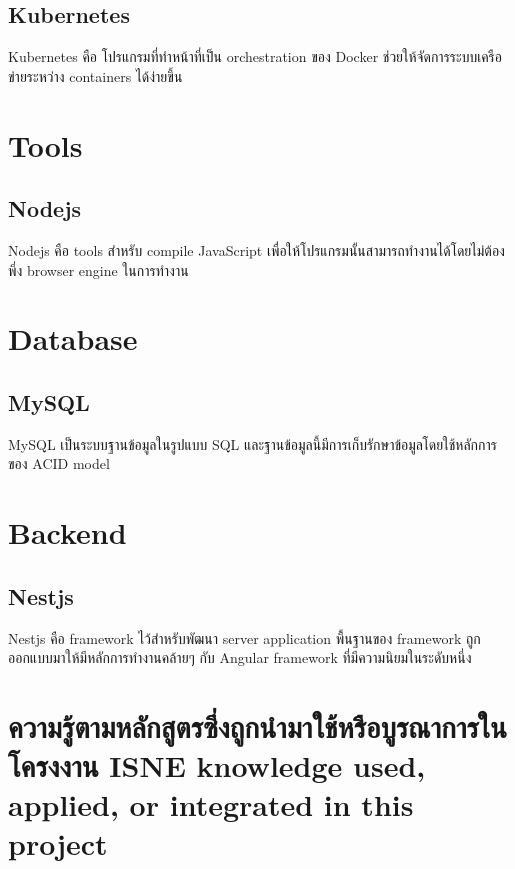 \subsection{Kubernetes}

Kubernetes \cite{kubernetes} คือ โปรแกรมที่ทำหน้าที่เป็น orchestration \cite  {orchestration} ของ Docker ช่วยให้จัดการระบบเครือข่ายระหว่าง containers ได้ง่ายขึ้น

\section{Tools}

\subsection{Nodejs}

Nodejs \cite{nodejs} คือ tools สำหรับ compile JavaScript \cite{javascript} เพื่อให้โปรแกรมนั้นสามารถทำงานได้โดยไม่ต้องพึ่ง browser engine ในการทำงาน

\section{Database}
\subsection{MySQL}

MySQL เป็นระบบฐานข้อมูลในรูปแบบ SQL และฐานข้อมูลนี้มีการเก็บรักษาข้อมูลโดยใช้หลักการของ ACID model \cite{acid}

\section{Backend}

\subsection{Nestjs}

Nestjs \cite{nestjs} คือ  framework ไว้สำหรับพัฒนา server application \cite {serverapplication} พื้นฐานของ framework ถูกออกแบบมาให้มีหลักการทำงานคล้ายๆ กับ Angular framework \cite{angular} ที่มีความนิยมในระดับหนึ่ง

\section{\ifcpe%
ความรู้ตามหลักสูตรซึ่งถูกนำมาใช้หรือบูรณาการในโครงงาน
\else%
ISNE knowledge used, applied, or integrated in this project
\fi
}

